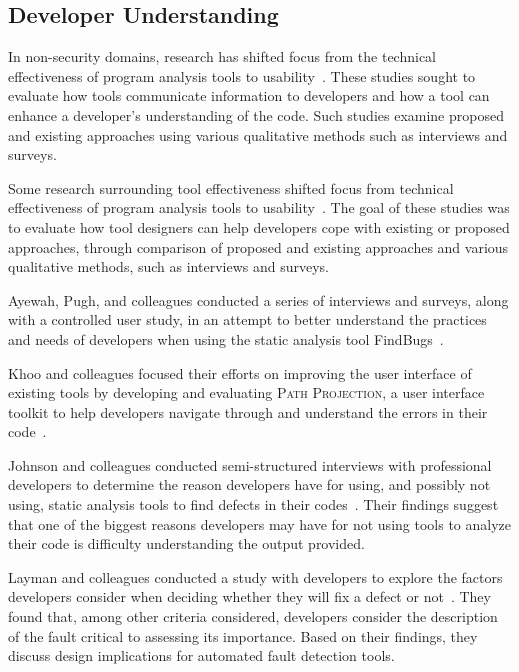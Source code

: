 \documentclass[conference]{IEEEtran}
\begin{document}
\subsection{Developer Understanding}
\label{understanding}
In non-security domains, research has shifted focus from the technical effectiveness of program analysis tools to usability~\cite{johnson2013don, ayewah2008using, khoo2008path}. 
These studies sought to evaluate how tools communicate information to developers and how a tool can enhance a developer's understanding of the code. 
Such studies examine proposed and existing approaches using various qualitative methods such as interviews and surveys. 

Some research surrounding tool effectiveness shifted focus from technical effectiveness of program analysis tools to usability~\cite{johnson2013don, ayewah2008using, khoo2008path}. 
The goal of these studies was to evaluate how tool designers can help developers cope with existing or proposed approaches, through comparison of proposed and existing approaches and various qualitative methods, such as interviews and surveys.

Ayewah, Pugh, and colleagues conducted a series of interviews and surveys, along with a controlled user study, in an attempt to better understand the practices and needs of developers when using the static analysis tool FindBugs~\cite{ayewah2008report, ayewah2008using}.

Khoo and colleagues focused their efforts on improving the user interface of existing tools by developing and evaluating \textsc{Path Projection}, a user interface toolkit to help developers navigate through and understand the errors in their code~\cite{khoo2008path}.

Johnson and colleagues conducted semi-structured interviews with professional developers to determine the reason developers have for using, and possibly not using, static analysis tools to find defects in their codes~\cite{johnson2013don}. 
Their findings suggest that one of the biggest reasons developers may have for not using tools to analyze their code is difficulty understanding the output provided. 

Layman and colleagues conducted a study with developers to explore the factors developers consider when deciding whether they will fix a defect or not~\cite{layman2007toward}. 
They found that, among other criteria considered, developers consider the description of the fault critical to assessing its importance. 
Based on their findings, they discuss design implications for automated fault detection tools.
\end{document}
